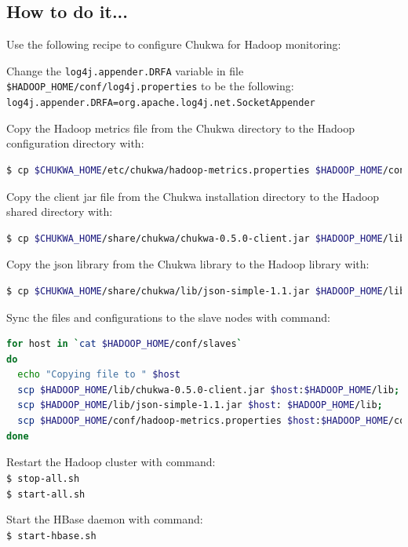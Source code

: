 \subsection*{How to do it...}
Use the following recipe to configure Chukwa for Hadoop monitoring:

Change the \verb|log4j.appender.DRFA| variable in file \verb|$HADOOP_HOME/conf/log4j.properties| to be the following: \\
\verb|log4j.appender.DRFA=org.apache.log4j.net.SocketAppender|

Copy the Hadoop metrics file from the Chukwa directory to the Hadoop configuration directory with:
\lstset{style=bashstyle}
\begin{lstlisting}[language=bash]
$ cp $CHUKWA_HOME/etc/chukwa/hadoop-metrics.properties $HADOOP_HOME/conf
\end{lstlisting}

Copy the client jar file from the Chukwa installation directory to the Hadoop shared directory with:
\lstset{style=bashstyle}
\begin{lstlisting}[language=bash]
$ cp $CHUKWA_HOME/share/chukwa/chukwa-0.5.0-client.jar $HADOOP_HOME/lib
\end{lstlisting}

Copy the json library from the Chukwa library to the Hadoop library with:
\lstset{style=bashstyle}
\begin{lstlisting}[language=bash]
$ cp $CHUKWA_HOME/share/chukwa/lib/json-simple-1.1.jar $HADOOP_HOME/lib
\end{lstlisting}

Sync the files and configurations to the slave nodes with command: 
\lstset{style=bashstyle}
\begin{lstlisting}[language=bash]
for host in `cat $HADOOP_HOME/conf/slaves`
do
  echo "Copying file to " $host
  scp $HADOOP_HOME/lib/chukwa-0.5.0-client.jar $host:$HADOOP_HOME/lib;
  scp $HADOOP_HOME/lib/json-simple-1.1.jar $host: $HADOOP_HOME/lib;
  scp $HADOOP_HOME/conf/hadoop-metrics.properties $host:$HADOOP_HOME/conf
done
\end{lstlisting}

Restart the Hadoop cluster with command: \\
\verb|$ stop-all.sh| \\
\verb|$ start-all.sh|

Start the HBase daemon with command: \\
\verb|$ start-hbase.sh|


